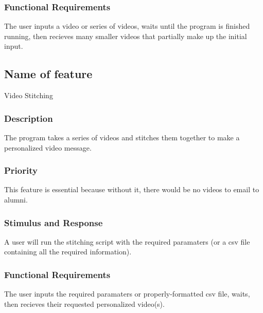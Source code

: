 \subsubsection{Functional Requirements}
The user inputs a video or series of videos, waits until the program is finished running, then recieves many smaller videos that partially make up the initial input.



\subsection{Name of feature}
Video Stitching
\subsubsection{Description}
The program takes a series of videos and stitches them together to make a personalized video message.

\subsubsection{Priority}
This feature is essential because without it, there would be no videos to email to alumni.

\subsubsection{Stimulus and Response}
A user will run the stitching script with the required paramaters (or a csv file containing all the required information).

\subsubsection{Functional Requirements}
The user inputs the required paramaters or properly-formatted csv file, waits, then recieves their requested personalized video(s).



